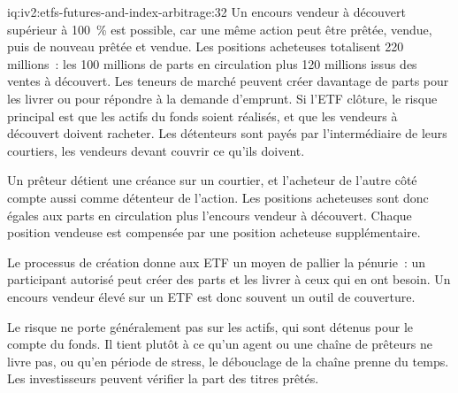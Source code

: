 \begin{solution}{iq:iv2:etfs-futures-and-index-arbitrage:32}
Un encours vendeur à découvert supérieur à 100~\% est possible, car une même action peut être prêtée, vendue, puis de nouveau prêtée et vendue. Les positions acheteuses totalisent 220 millions~: les 100 millions de parts en circulation plus 120 millions issus des ventes à découvert. Les teneurs de marché peuvent créer davantage de parts pour les livrer ou pour répondre à la demande d'emprunt. Si l'ETF clôture, le risque principal est que les actifs du fonds soient réalisés, et que les vendeurs à découvert doivent racheter. Les détenteurs sont payés par l'intermédiaire de leurs courtiers, les vendeurs devant couvrir ce qu'ils doivent.

Un prêteur détient une créance sur un courtier, et l'acheteur de l'autre côté compte aussi comme détenteur de l'action. Les positions acheteuses sont donc égales aux parts en circulation plus l'encours vendeur à découvert. Chaque position vendeuse est compensée par une position acheteuse supplémentaire.

Le processus de création donne aux ETF un moyen de pallier la pénurie~: un participant autorisé peut créer des parts et les livrer à ceux qui en ont besoin. Un encours vendeur élevé sur un ETF est donc souvent un outil de couverture.

Le risque ne porte généralement pas sur les actifs, qui sont détenus pour le compte du fonds. Il tient plutôt à ce qu'un agent ou une chaîne de prêteurs ne livre pas, ou qu'en période de stress, le débouclage de la chaîne prenne du temps. Les investisseurs peuvent vérifier la part des titres prêtés.

\end{solution}

